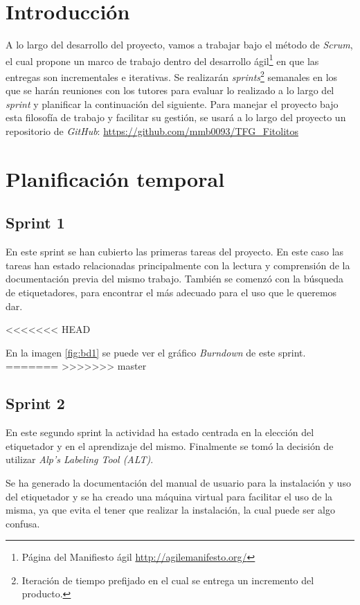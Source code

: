 
\section{Introducción}
A lo largo del desarrollo del proyecto, vamos a trabajar bajo el método de \textit{Scrum}, el cual propone un marco de trabajo dentro del desarrollo ágil\footnote{Página del Manifiesto ágil \url{http://agilemanifesto.org/}} en que las entregas son incrementales e iterativas. Se realizarán \textit{sprints}\footnote{Iteración de tiempo prefijado en el cual se entrega un incremento del producto.} semanales en los que se harán reuniones con los tutores para evaluar lo realizado a lo largo del \textit{sprint} y planificar la continuación del siguiente.
Para manejar el proyecto bajo esta filosofía de trabajo y facilitar su gestión, se usará a lo largo del proyecto un repositorio de \textit{GitHub}: \url{https://github.com/mmb0093/TFG_Fitolitos}

\section{Planificación temporal}
\subsection{Sprint 1}
En este sprint se han cubierto las primeras tareas del proyecto. En este caso las tareas han estado relacionadas principalmente con la lectura y comprensión de la documentación previa del mismo trabajo.
También se comenzó con la búsqueda de etiquetadores, para encontrar el más adecuado para el uso que le queremos dar.

<<<<<<< HEAD

En la imagen \ref{fig:bd1} se puede ver el gráfico \textit{Burndown}  de este sprint.
=======
>>>>>>> master

\subsection{Sprint 2}
En este segundo sprint la actividad ha estado centrada en la elección del etiquetador y en el aprendizaje del mismo. Finalmente se tomó la decisión de utilizar \textit{Alp’s Labeling Tool (ALT)}. 

Se ha generado la documentación del manual de usuario para la instalación y uso del etiquetador y se ha creado una máquina virtual para facilitar el uso de la misma, ya que evita el tener que realizar la instalación, la cual puede ser algo confusa.

